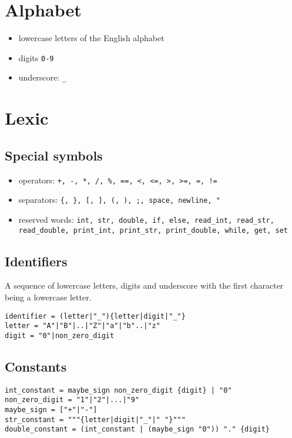 \documentclass[11pt]{article}
\author{Alex Pop}
\date{\today}
\title{}
\begin{document}
\tableofcontents

\section{Alphabet}
\label{sec:org8211244}
\begin{itemize}
\item lowercase letters of the English alphabet
\item digits \texttt{0-9}
\item underscore: \texttt{\_}
\end{itemize}

\section{Lexic}
\label{sec:org33c1541}
\subsection{Special symbols}
\label{sec:org7979c88}
\begin{itemize}
\item operators: \texttt{+, -, *, /, \%, ==, <, <=, >, >=, =, !=}
\item separators: \texttt{\{, \}, [, ], (, ), ;, space, newline, "}
\item reserved words: \texttt{int, str, double, if, else, read\_int, read\_str, read\_double, print\_int, print\_str, print\_double, while, get, set}
\end{itemize}

\subsection{Identifiers}
\label{sec:org55b9f77}
A sequence of lowercase letters, digits and underscore with the first character being a lowercase letter.
\begin{verbatim}
identifier = (letter|"_"){letter|digit|"_"}
letter = "A"|"B"|..|"Z"|"a"|"b"..|"z"
digit = "0"|non_zero_digit
\end{verbatim}

\subsection{Constants}
\label{sec:orgfdd8abd}
\begin{verbatim}
int_constant = maybe_sign non_zero_digit {digit} | "0"
non_zero_digit = "1"|"2"|...|"9"
maybe_sign = ["+"|"-"]
str_constant = """{letter|digit|"_"|" "}"""
double_constant = (int_constant | (maybe_sign "0")) "." {digit}
\end{verbatim}
\end{document}

